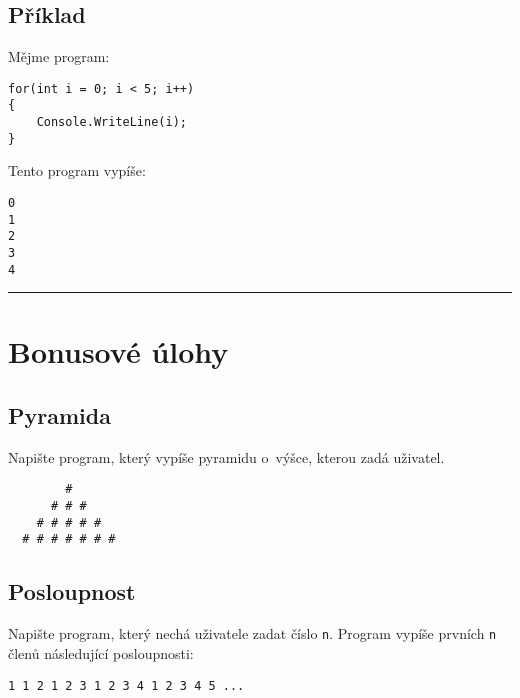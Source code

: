 \documentclass[12pt,a4paper]{article}
\begin{document}
\subsection*{Příklad}

Mějme program:

\begin{verbatim}
for(int i = 0; i < 5; i++)
{
    Console.WriteLine(i);
}
\end{verbatim}
Tento program vypíše:

\begin{verbatim}
0
1
2
3
4
\end{verbatim}

\noindent\rule{\textwidth}{1pt}
\section*{Bonusové úlohy}

\begin{multicols}{2}

\subsection{Pyramida}

Napište program, který vypíše pyramidu o výšce, kterou zadá uživatel.

\begin{verbatim}
        #
      # # #
    # # # # #
  # # # # # # #
\end{verbatim}

\subsection{Posloupnost}

Napište program, který nechá uživatele zadat číslo \texttt{n}. Program vypíše
prvních \texttt{n} členů následující posloupnosti:

\noindent\texttt{1 1 2 1 2 3 1 2 3 4 1 2 3 4 5 ...}

\end{multicols}
\end{document}
